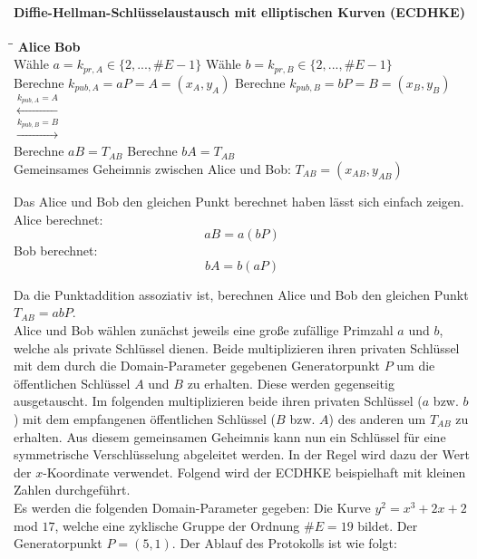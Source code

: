 \paragraph{Diffie-Hellman-Schlüsselaustausch mit elliptischen Kurven (ECDHKE)}
\begin{tabbing}
\qquad \qquad \qquad \qquad \qquad \qquad \qquad \qquad \= \qquad \qquad \qquad \= \qquad \qquad \qquad \qquad \qquad \qquad \qquad \qquad \kill
\textbf{Alice} \> \> \textbf{Bob}\\
Wähle $a=k_{pr,A} \in \{2,..., \#E-1\}$ \> \> Wähle $b=k_{pr,B} \in \{2,..., \#E-1\}$\\
Berechne $k_{pub,A} = aP = A = (x_A,y_A)$ \> \> Berechne $k_{pub,B} = bP = B = (x_B, y_B)$\\
\> $\xleftarrow{k_{pub,A} = A}$ \> \\
\> $\xrightarrow{k_{pub,B} = B}$ \> \\
Berechne $aB = T_{AB}$ \> \> Berechne $bA = T_{AB}$\\
Gemeinsames Geheimnis zwischen Alice und Bob: $T_{AB} = (x_{AB}, y_{AB})$\\
\end{tabbing}
Das Alice und Bob den gleichen Punkt berechnet haben lässt sich einfach zeigen.\\

Alice berechnet: $$aB = a(bP)$$
Bob berechnet: $$bA = b(aP)$$

Da die Punktaddition assoziativ ist, berechnen Alice und Bob den gleichen Punkt $T_{AB} = abP$.\\

Alice und Bob wählen zunächst jeweils eine große zufällige Primzahl $a$ und $b$, welche als private Schlüssel dienen. Beide multiplizieren ihren privaten Schlüssel mit dem durch die Domain-Parameter gegebenen Generatorpunkt $P$ um die öffentlichen Schlüssel $A$ und $B$ zu erhalten. Diese werden gegenseitig ausgetauscht. Im folgenden multiplizieren beide ihren privaten Schlüssel ($a$ bzw. $b$) mit dem empfangenen öffentlichen Schlüssel ($B$ bzw. $A$) des anderen um $T_{AB}$ zu erhalten. Aus diesem gemeinsamen Geheimnis kann nun ein Schlüssel für eine symmetrische Verschlüsselung abgeleitet werden. In der Regel wird dazu der Wert der $x$-Koordinate verwendet. Folgend wird der ECDHKE beispielhaft mit kleinen Zahlen durchgeführt.\\

Es werden die folgenden Domain-Parameter gegeben: Die Kurve $y^2 = x^3 + 2x + 2$ mod $17$, welche eine zyklische Gruppe der Ordnung $\#E = 19$ bildet. Der Generatorpunkt $P = (5,1)$. Der Ablauf des Protokolls ist wie folgt:

